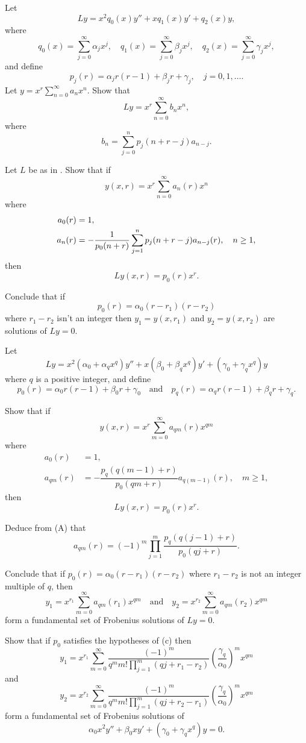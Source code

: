 \begin{exerciselist}
\item\label{exer:7.5.57}Let
\[
Ly=x^2q_0(x)y''+xq_1(x)y'+q_2(x)y,
\]
where
\[
q_0(x)=\sum_{j=0}^\infty \alpha_jx^j,\quad
q_1(x)=\sum_{j=0}^\infty \beta_jx^j,\quad
q_2(x)=\sum_{j=0}^\infty \gamma_jx^j,
\]
and define
\[
p_j(r)=\alpha_jr(r-1)+\beta_jr+\gamma_j,\quad j=0,1,\dots.
\]
 Let $y=x^r\sum_{n=0}^\infty a_nx^n$. Show that
\[
Ly=x^r\sum_{n=0}^\infty  b_nx^n,
\]
where
\[
b_n=\sum_{j=0}^np_j(n+r-j)a_{n-j}.
\]

\item\label{exer:7.5.58}\begin{alist}
\item %
Let  $L$ be as in . Show that if
\[
y(x,r)=x^r\sum_{n=0}^\infty a_n(r)x^n
\]
where
\begin{align*}
a_0(r)&=1,\\
a_n(r)&=-\displaystyle\frac{1}{p_0(n+r)}\sum_{j=1}^n p_j(n+r-j)a_{n-j}(r),\quad
n\ge1,
\end{align*}
then
\[
Ly(x,r)=p_0(r)x^r.
\]
\item %
Conclude that if
\[
p_0(r)=\alpha_0(r-r_1)(r-r_2)
\]
where $r_1-r_2$ isn't  an integer then $y_1=y(x,r_1)$ and $y_2=y(x,r_2)$
are solutions of $Ly=0$.
\end{alist}

\item\label{exer:7.5.59}Let
\[
Ly=x^2(\alpha_0+\alpha_qx^q)y''+x(\beta_0+\beta_qx^q)y'+
(\gamma_0+\gamma_qx^q)y
\]
where $q$ is a positive integer, and  define
\[
p_0(r)=\alpha_0r(r-1)+\beta_0r+\gamma_0\quad\text{and}\quad
p_q(r)=\alpha_qr(r-1)+\beta_qr+\gamma_q.
\]
\begin{alist}
\item %
Show that if
\[
y(x,r)=x^{r}\sum_{m=0}^\infty a_{qm}(r)x^{qm}
\]
where
\[\tag{A}
\begin{aligned}
a_0(r)&=1,\\
a_{qm}(r)&=-\dfrac{p_q\left(q(m-1)+r\right)}{p_0(qm+r)}a_{q(m-1)}(r),\quad m\ge1,
\end{aligned}
\]
then
\[
Ly(x,r)=p_0(r)x^r.
\]
\item %
Deduce from (A) that
\[
a_{qm}(r)=(-1)^m\prod_{j=1}^m\frac{p_q\left(q(j-1)+r\right)}{p_0(qj+r)}.
\]
\item %
Conclude that if $p_0(r)=\alpha_0(r-r_1)(r-r_2)$ where $r_1-r_2$
is not an integer multiple of $q$, then
\[
y_1=x^{r_1}\sum_{m=0}^\infty a_{qm}(r_1)x^{qm}\quad\text{and}\quad
y_2=x^{r_2}\sum_{m=0}^\infty a_{qm}(r_2)x^{qm}
\]
form a fundamental set of Frobenius solutions of $Ly=0$.
\item %
Show that if $p_0$ satisfies the hypotheses of (c) then
\[
y_1=x^{r_1}\sum_{m=0}^\infty\frac{(-1)^m}{q^mm!\prod_{j=1}^m(qj+r_1-r_2)}
\left(\frac{\gamma_q}{\alpha_0}\right)^mx^{qm}
\]
and
\[
y_2=x^{r_2}\sum_{m=0}^\infty\frac{(-1)^m}{q^mm!\prod_{j=1}^m(qj+r_2-r_1)}
\left(\frac{\gamma_q}{\alpha_0}\right)^mx^{qm}
\]
form a fundamental set of Frobenius solutions of
\[
\alpha_0x^2y''+\beta_0xy'+(\gamma_0+\gamma_qx^q)y=0.
\]
\end{alist}


\end{exerciselist}
